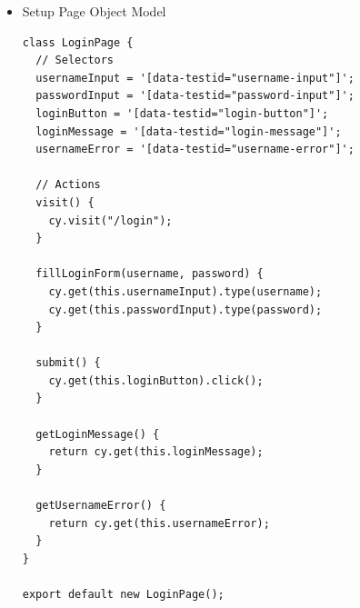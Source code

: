 \documentclass[a4paper,12pt]{article}
\begin{document}
{\begin{itemize}
\begin{tcolorbox}[breakable, colback=green!5,colframe=black!50,title=Test Environment ]
\begin{lstlisting}
module.exports = defineConfig({
  e2e: {
    baseUrl: "http://localhost:5173",
    setupNodeEvents(on, config) {
      // implement node event listeners here
    },
  },
});

\end{lstlisting}
\end{tcolorbox}


    \item Setup Page Object Model



\begin{tcolorbox}[breakable, colback=green!5,colframe=black!50,title=LoginPage.js]
\begin{lstlisting}
class LoginPage {
  // Selectors
  usernameInput = '[data-testid="username-input"]';
  passwordInput = '[data-testid="password-input"]';
  loginButton = '[data-testid="login-button"]';
  loginMessage = '[data-testid="login-message"]';
  usernameError = '[data-testid="username-error"]';

  // Actions
  visit() {
    cy.visit("/login");
  }

  fillLoginForm(username, password) {
    cy.get(this.usernameInput).type(username);
    cy.get(this.passwordInput).type(password);
  }

  submit() {
    cy.get(this.loginButton).click();
  }

  getLoginMessage() {
    return cy.get(this.loginMessage);
  }

  getUsernameError() {
    return cy.get(this.usernameError);
  }
}

export default new LoginPage();

\end{lstlisting}
\end{tcolorbox}






\end{itemize}}
\end{document}
